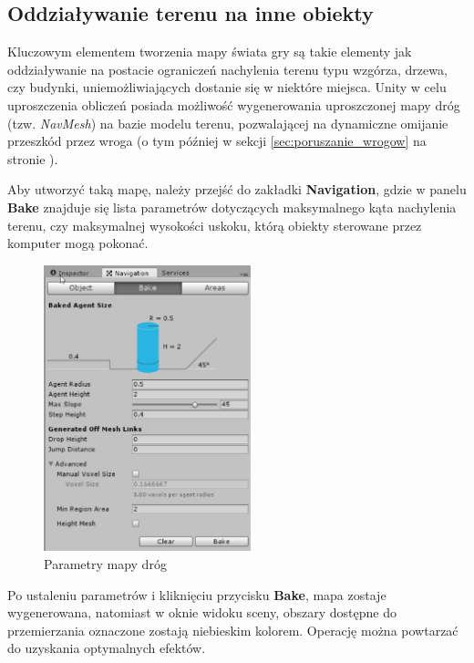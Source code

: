 \documentclass[openright]{xmgr}
\newcommand{\name}[1]{\textbf{\textcolor{NavyBlue}{#1}}}
\begin{document}

    \subsection{Oddziaływanie terenu na inne obiekty}

        Kluczowym elementem tworzenia mapy świata gry są takie elementy jak oddziaływanie na postacie ograniczeń nachylenia terenu typu wzgórza, drzewa, czy budynki, uniemożliwiających dostanie się w niektóre miejsca. Unity w celu uproszczenia obliczeń posiada możliwość wygenerowania uproszczonej mapy dróg (tzw. \textit{NavMesh}) na bazie modelu terenu, pozwalającej na dynamiczne omijanie przeszkód przez wroga (o tym później w sekcji \ref{sec:poruszanie_wrogow} na stronie \pageref{sec:poruszanie_wrogow}).

        Aby utworzyć taką mapę, należy przejść do zakładki \name{Navigation}, gdzie w panelu \name{Bake} znajduje się lista parametrów dotyczących maksymalnego kąta nachylenia terenu, czy maksymalnej wysokości uskoku, którą obiekty sterowane przez komputer mogą pokonać.

        \begin{figure}[H]
        \center
        \includegraphics[width=6cm]{teren_obiekty2.png}
        \caption{Parametry mapy dróg}
        \end{figure}

        Po ustaleniu parametrów i kliknięciu przycisku \name{Bake}, mapa zostaje wygenerowana, natomiast w oknie widoku sceny, obszary dostępne do przemierzania oznaczone zostają niebieskim kolorem. Operację można powtarzać do uzyskania optymalnych efektów.
\end{document}

